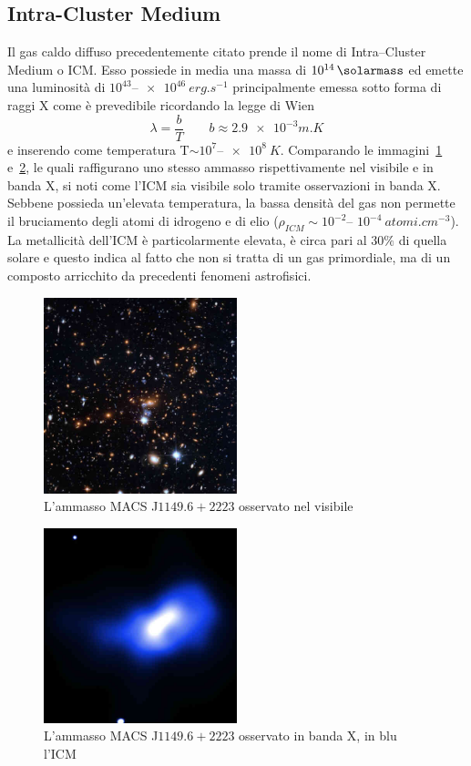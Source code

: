 \subsection{Intra-Cluster Medium}\label{sec:intra-cluster-medium}
Il gas caldo diffuso precedentemente citato prende il nome di Intra--Cluster Medium o ICM. Esso possiede in media una massa di $10^{14}\, \si{\solarmass}$ ed emette una luminosità di $10^{43}$--$\SI{e46}{erg.s^{-1}}$ principalmente emessa sotto forma di raggi X come è prevedibile ricordando la legge di Wien
\begin{equation}
    \lambda = \frac{b}{T}                                         \qquad b \approx \num{2.9e-3} \si{m.K} 
\end{equation}
e inserendo come temperatura T$\sim 10^7$--$\SI{e8}{K}$.
Comparando le immagini~\ref{fig:visible-icm} e~\ref{fig:icm}, le quali raffigurano uno stesso ammasso rispettivamente nel visibile e in banda X, si noti come l'ICM sia visibile solo tramite osservazioni in banda X.
Sebbene possieda un’elevata temperatura, la bassa densità del gas non permette il bruciamento degli atomi di idrogeno e di elio ($\rho_{ICM}\sim 10^{-2}$-- $10^{-4}\:\si{atomi.cm^{-3}}$).
La metallicità dell’ICM è particolarmente elevata, è circa pari al $30\%$ di quella solare e questo indica al fatto che non si tratta di un gas primordiale, ma di un composto arricchito da precedenti fenomeni astrofisici.
\begin{figure}
    \centering
    \includegraphics[width = 0.5\textwidth]{immagini/visible-icm.jpg}
    \caption{L'ammasso MACS J$1149.6+2223$ osservato nel visibile}
    \label{fig:visible-icm}
\end{figure}
\begin{figure}
    \centering
    \includegraphics[width = 0.5\textwidth]{immagini/icm.jpg}
    \caption{L'ammasso MACS J$1149.6+2223$ osservato in banda X, in blu l'ICM}
    \label{fig:icm}
\end{figure}
